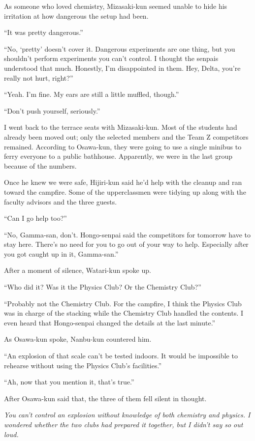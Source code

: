 \documentclass[
    a4paper,
    12pt,
    twoside,
    openany,
    UTF8,
    fontset=windows
]{ctexbook}
\begin{document}
As someone who loved chemistry, Mizasaki-kun seemed unable to hide his irritation at how dangerous the setup had been.

``It was pretty dangerous.''

``No, `pretty' doesn't cover it. Dangerous experiments are one thing, but you shouldn't perform experiments you can't control. I thought the senpais understood that much. Honestly, I'm disappointed in them. Hey, Delta, you're really not hurt, right?''

``Yeah. I'm fine. My ears are still a little muffled, though.''

``Don't push yourself, seriously.''

I went back to the terrace seats with Mizasaki-kun. Most of the students had already been moved out; only the selected members and the Team Z competitors remained. According to Osawa-kun, they were going to use a single minibus to ferry everyone to a public bathhouse. Apparently, we were in the last group because of the numbers.

Once he knew we were safe, Hijiri-kun said he'd help with the cleanup and ran toward the campfire. Some of the upperclassmen were tidying up along with the faculty advisors and the three guests.

``Can I go help too?''

``No, Gamma-san, don't. Hongo-senpai said the competitors for tomorrow have to stay here. There's no need for you to go out of your way to help. Especially after you got caught up in it, Gamma-san.''

After a moment of silence, Watari-kun spoke up.

``Who did it? Was it the Physics Club? Or the Chemistry Club?''

``Probably not the Chemistry Club. For the campfire, I think the Physics Club was in charge of the stacking while the Chemistry Club handled the contents. I even heard that Hongo-senpai changed the details at the last minute.''

As Osawa-kun spoke, Nanbu-kun countered him.

``An explosion of that scale can't be tested indoors. It would be impossible to rehearse without using the Physics Club's facilities.''

``Ah, now that you mention it, that's true.''

After Osawa-kun said that, the three of them fell silent in thought.

\textit{You can't control an explosion without knowledge of both chemistry and physics. I wondered whether the two clubs had prepared it together, but I didn't say so out loud.}
\end{document}
